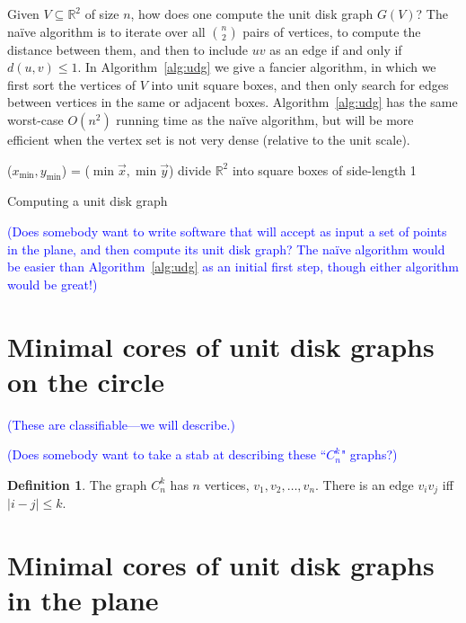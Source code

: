 \documentclass[amscd, amssymb, verbatim]{amsart}[12pt]
\newcommand{\note}[1]{\textcolor{blue}{({#1})}}
\theoremstyle{plain}
\theoremstyle{definition}
\newtheorem{definition}[lemma]{Definition}
\newcommand{\R}{\mathbb{R}}
\begin{document}
Given $V\subseteq \R^2$ of size $n$, how does one compute the unit disk graph $G(V)$?
The na\"{i}ve algorithm is to iterate over all $\binom{n}{2}$ pairs of vertices, to compute the distance between them, and then to include $uv$ as an edge if and only if $d(u,v)\le1$.
In Algorithm~\ref{alg:udg} we give a fancier algorithm, in which we first sort the vertices of $V$ into unit square boxes, and then only search for edges between vertices in the same or adjacent boxes.
Algorithm~\ref{alg:udg} has the same worst-case $O(n^2)$ running time as the na\"{i}ve algorithm, but will be more efficient when the vertex set is not very dense (relative to the unit scale).

\begin{algorithm}[ht]
\SetAlgoLined
\KwData{Vertex set $V(\vec{x},\vec{y})\subseteq\R^2$}
($x_\text{min}, y_\text{min}$) = ($\min\vec{x},\min\vec{y}$)\;
divide $\R^2$ into square boxes of side-length 1\;
\caption{Computing a unit disk graph}
\label{alg:udg}
\end{algorithm}

\note{Does somebody want to write software that will accept as input a set of points in the plane, and then compute its unit disk graph?
The na\"{i}ve algorithm would be easier than Algorithm~\ref{alg:udg} as an initial first step, though either algorithm would be great!}



\section{Minimal cores of unit disk graphs on the circle}

\note{These are classifiable---we will describe.}

\note{Does somebody want to take a stab at describing these ``$C_n^k$" graphs?}

\begin{definition}
The graph $C_n^k$ has $n$ vertices, $v_1, v_2, \ldots, v_n$. There is an edge $v_iv_j$ iff $|i - j| \leq k$.
\end{definition}

\cite{Adamaszek2013,AA-VRS1,AAFPP-J}


\section{Minimal cores of unit disk graphs in the plane}
\end{document}
